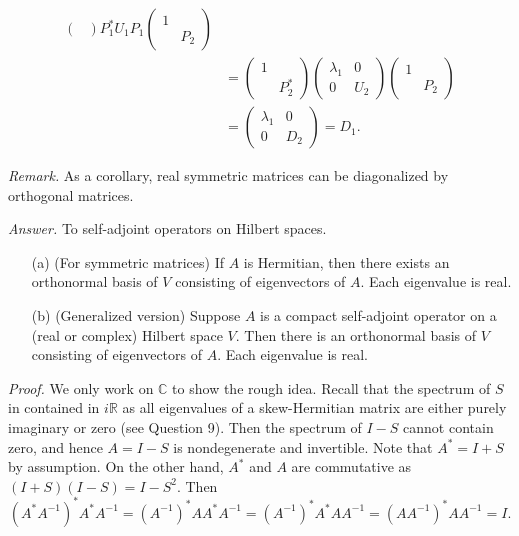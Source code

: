 \documentclass{mathproblems}
\newcommand\C{\mathbb{C}}
\newcommand\R{\mathbb{R}}
\begin{document}
\begin{questions}
$$\begin{aligned}
\begin{pmatrix}
\end{pmatrix} P_1^* U_1 P_1\begin{pmatrix}
1 & \\
& P_2
\end{pmatrix} \\
&=\begin{pmatrix}
1 & \\
& P_2^*
\end{pmatrix}\begin{pmatrix}
\lambda_1 & 0 \\
0 & U_2
\end{pmatrix}\begin{pmatrix}
1 & \\
& P_2
\end{pmatrix} \\
&=\begin{pmatrix}
\lambda_1 & 0 \\
0 & D_2
\end{pmatrix}=D_1.
\end{aligned}
$$


\textit{Remark.} As a corollary, real symmetric matrices can be diagonalized by orthogonal matrices. 




\textit{Answer.} To self-adjoint operators on Hilbert spaces. \vspace{-4pt}
\begin{itemize}
\item [(a)] (For symmetric matrices) If $A$ is Hermitian, then there exists an orthonormal basis of $V$ consisting of eigenvectors of $A$. Each eigenvalue is real.
\item [(b)] (Generalized version) Suppose $A$ is a compact self-adjoint operator on a (real or complex) Hilbert space $V$. Then there is an orthonormal basis of $V$ consisting of eigenvectors of $A$. Each eigenvalue is real.
\end{itemize}



\textit{Proof.} We only work on $\C$ to show the rough idea. Recall that the spectrum of $S$ in contained in $i\R$ as all eigenvalues of a skew-Hermitian matrix are either purely imaginary or zero (see Question 9). Then the spectrum of $I-S$ cannot contain zero, and hence $A=I-S$ is nondegenerate and invertible. Note that $A^*=I+S$ by assumption. On the other hand, $A^*$ and $A$ are commutative as $(I+S)(I-S)=I-S^2$. Then
$$
(A^*A^{-1})^* A^*A^{-1}=(A^{-1})^* A A^* A^{-1}=(A^{-1})^* A^* A A^{-1}=(AA^{-1})^* AA^{-1}=I.
$$


\end{questions}
\end{document}
